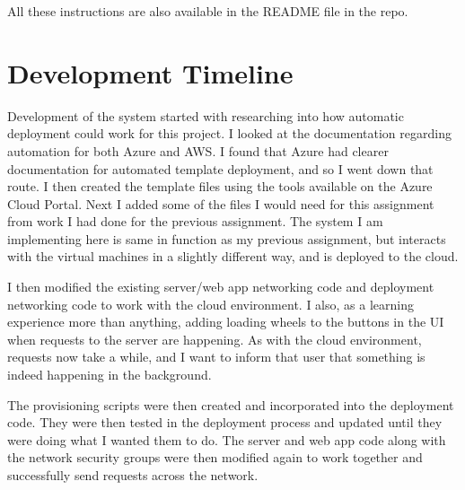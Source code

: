 \documentclass[12pt]{extarticle}
\begin{document}
All these instructions are also available in the README file in the repo.

\section{Development Timeline}
Development of the system started with researching into how automatic deployment could work for this project. I looked at the documentation regarding automation for both Azure and AWS. I found that Azure had clearer documentation for automated template deployment, and so I went down that route. I then created the template files using the tools available on the Azure Cloud Portal. Next I added some of the files I would need for this assignment from work I had done for the previous assignment. The system I am implementing here is same in function as my previous assignment, but interacts with the virtual machines in a slightly different way, and is deployed to the cloud. 

I then modified the existing server/web app networking code and deployment networking code to work with the cloud environment. I also, as a learning experience more than anything, adding loading wheels to the buttons in the UI when requests to the server are happening. As with the cloud environment, requests now take a while, and I want to inform that user that something is indeed happening in the background. 

The provisioning scripts were then created and incorporated into the deployment code. They were then tested in the deployment process and updated until they were doing what I wanted them to do. The server and web app code along with the network security groups were then modified again to work together and successfully send requests across the network. 
\end{document}
